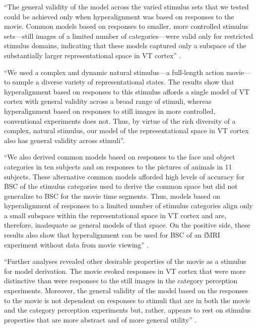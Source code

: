 ``The general validity of the model across the varied stimulus sets that we
tested could be achieved only when hyperalignment was based on responses to the
movie.
%
Common models based on responses to smaller, more controlled stimulus
sets---still images of a limited number of categories---were valid only for
restricted stimulus domains, indicating that these models captured only a
subspace of the substantially larger representational space in VT cortex''
\citep{haxby2011common}.

``We used a complex and dynamic natural stimulus---a full-length action
movie---to sample a diverse variety of representational states.
%
The results show that hyperalignment based on responses to this stimulus affords
a single model of VT cortex with general validity across a broad range of
stimuli, whereas hyperalignment based on responses to still images in more
controlled, conventional experiments does not.
%
Thus, by virtue of the rich diversity of a complex, natural stimulus, our model
of the representational space in VT cortex also has general validity across
stimuli''\citep{haxby2011common}.

``We also derived common models based on responses to the face and object
categories in ten subjects and on responses to the pictures of animals in 11
subjects.
%
These alternative common models afforded high levels of accuracy for BSC of the
stimulus categories used to derive the common space but did not generalize to
BSC for the movie time segments.
%
Thus, models based on hyperalignment of responses to a limited number of
stimulus categories align only a small subspace within the representational
space in VT cortex and are, therefore, inadequate as general models of that
space.
%
On the positive side, these results also show that hyperalignment can be used
for BSC of an fMRI experiment without data from movie viewing''
\citep{haxby2011common}.

%
``Further analyses revealed other desirable properties of the movie as a
stimulus for model derivation.
%
The movie evoked responses in VT cortex that were more distinctive than were
responses to the still images in the category perception experiments.
%
Moreover, the general validity of the model based on the responses to the movie
is not dependent on responses to stimuli that are in both the movie and the
category perception experiments but, rather, appears to rest on stimulus
properties that are more abstract and of more general utility''
\citep{haxby2011common}.


